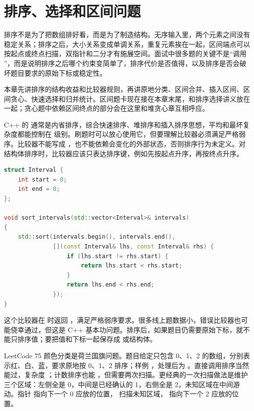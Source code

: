 \chapter{排序、选择和区间问题}

排序不是为了把数组排好看，而是为了制造结构。无序输入里，两个元素之间没有稳定关系；排序之后，大小关系变成单调关系，重复元素挨在一起，区间端点可以按起点或终点扫描，双指针和二分才有施展空间。面试中很多题的关键不是“调用 ”，而是说明排序之后哪个约束变简单了，排序代价是否值得，以及排序是否会破坏题目要求的原始下标或稳定性。

本章先讲排序的结构收益和比较器规则，再讲原地分类、区间合并、插入区间、区间贪心、快速选择和归并统计。区间题卡现在接在本章末尾，和排序选择讲义放在一起；贪心题中依赖区间终点的部分会在这里和堆贪心章互相呼应。

C++ 的  通常是内省排序，综合快速排序、堆排序和插入排序思想，平均和最坏复杂度都能控制在  级别。刷题时可以放心使用它，但要理解比较器必须满足严格弱序。比较器不能写成 ，也不能依赖会变化的外部状态，否则排序行为未定义。对结构体排序时，比较器应该只表达排序键，例如先按起点升序，再按终点升序。

\begin{lstlisting}[language=C++,caption={区间排序比较器：严格弱序}]
struct Interval {
    int start = 0;
    int end = 0;
};

void sort_intervals(std::vector<Interval>& intervals)
{
    std::sort(intervals.begin(), intervals.end(),
              [](const Interval& lhs, const Interval& rhs) {
                  if (lhs.start != rhs.start) {
                      return lhs.start < rhs.start;
                  }
                  return lhs.end < rhs.end;
              });
}
\end{lstlisting}

这个比较器在  时返回 ，满足严格弱序要求。很多线上题数据小，错误比较器也可能侥幸通过，但这是 C++ 基本功问题。排序后，如果题目仍需要原始下标，就不能只排序值；要把值和下标一起保存成  或结构体。

LeetCode 75 颜色分类是荷兰国旗问题。题目给定只包含 0、1、2 的数组，分别表示红、白、蓝，要求原地按 0、1、2 排序；样例 ，处理后为 \code{[0,0,1,1,2,2]}。直接调用排序当然能过，复杂度 ；计数排序也能 ，但需要两次扫描。更经典的一次扫描做法是维护三个区域：左侧全是 0，中间是已经确认的 1，右侧全是 2，未知区域在中间游动。指针  指向下一个 0 应放的位置， 扫描未知区域， 指向下一个 2 应放的位置。

